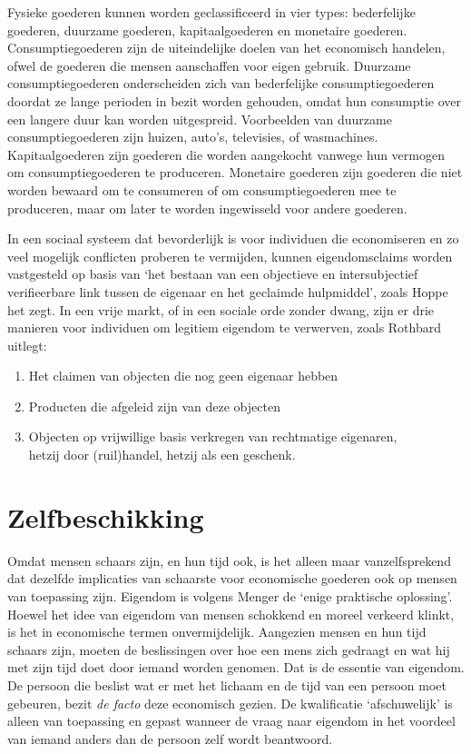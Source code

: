 Fysieke goederen kunnen worden geclassificeerd in vier types: bederfelijke goederen, duurzame goederen, kapitaalgoederen en monetaire goederen. Consumptiegoederen zijn de uiteindelijke doelen van het economisch handelen, ofwel de goederen die mensen aanschaffen voor eigen gebruik. Duurzame consumptiegoederen onderscheiden zich van bederfelijke consumptiegoederen doordat ze lange perioden in bezit worden gehouden, omdat hun consumptie over een langere duur kan worden uitgespreid. Voorbeelden van duurzame consumptiegoederen zijn huizen, auto's, televisies, of wasmachines. Kapitaalgoederen zijn goederen die worden aangekocht vanwege hun vermogen om consumptiegoederen te produceren. Monetaire goederen zijn goederen die niet worden bewaard om te consumeren of om consumptiegoederen mee te produceren, maar om later te worden ingewisseld voor andere goederen.

In een sociaal systeem dat bevorderlijk is voor individuen die economiseren en zo veel mogelijk conflicten proberen te vermijden, kunnen eigendomsclaims worden vastgesteld op basis van `het bestaan van een objectieve en intersubjectief verifieerbare link tussen de eigenaar en het geclaimde hulpmiddel', zoals Hoppe het zegt.\autocite{53} In een vrije markt, of in een sociale orde zonder dwang, zijn er drie manieren voor individuen om legitiem eigendom te verwerven, zoals Rothbard uitlegt:

\begin{enumerate}
\def\labelenumi{\arabic{enumi}.}
\item Het claimen van objecten die nog geen eigenaar hebben
\item Producten die afgeleid zijn van deze objecten
\item Objecten op vrijwillige basis verkregen van rechtmatige eigenaren, \\hetzij door (ruil)handel, hetzij als een geschenk.
\end{enumerate}

\section{Zelfbeschikking}

Omdat mensen schaars zijn, en hun tijd ook, is het alleen maar vanzelfsprekend dat dezelfde implicaties van schaarste voor economische goederen ook op mensen van toepassing zijn. Eigendom is volgens Menger de `enige praktische oplossing'. Hoewel het idee van eigendom van mensen schokkend en moreel verkeerd klinkt, is het in economische termen onvermijdelijk. Aangezien mensen en hun tijd schaars zijn, moeten de beslissingen over hoe een mens zich gedraagt en wat hij met zijn tijd doet door iemand worden genomen. Dat is de essentie van eigendom. De persoon die beslist wat er met het lichaam en de tijd van een persoon moet gebeuren, bezit \emph{de facto} deze economisch gezien. De kwalificatie `afschuwelijk' is alleen van toepassing en gepast wanneer de vraag naar eigendom in het voordeel van iemand anders dan de persoon zelf wordt beantwoord.

